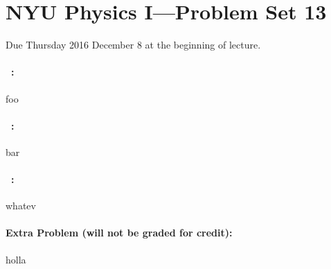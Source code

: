 \documentclass[12pt]{article}
\begin{document}
\section*{NYU Physics I---Problem Set 13}

Due Thursday 2016 December 8 at the beginning of lecture.

\paragraph{\problemname~\theproblem:}%
foo

\paragraph{\problemname~\theproblem:}%
bar

\paragraph{\problemname~\theproblem:}%
whatev

\paragraph{Extra Problem (will not be graded for credit):}%
holla
\end{document}
